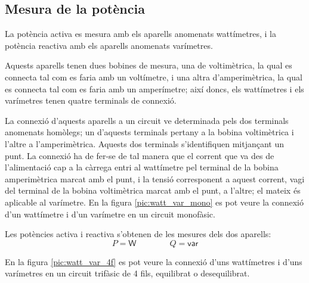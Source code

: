 \subsection{Mesura de la potència}

La potència activa es mesura amb els aparells anomenats wattímetres,
i la potència reactiva amb els aparells anomenats varímetres.

Aquests aparells tenen dues bobines de mesura, una de voltimètrica,
la qual es connecta tal com es faria amb un voltímetre, i una altra
d'amperimètrica, la qual es connecta tal com es faria amb un
amperímetre; així doncs, els wattímetres i els varímetres tenen
quatre terminals de connexió.

La connexió d'aquests aparells a un circuit ve determinada pels dos terminals
anomenats homòlegs; un d'aquests terminals pertany a la bobina
voltimètrica i l'altre a l'amperimètrica. Aquests dos terminals s'identifiquen mitjançant un punt. La connexió
ha de fer-se de tal manera que el corrent que va des de
l'alimentació cap a la càrrega entri al wattímetre pel terminal de
la bobina amperimètrica marcat amb el punt, i la tensió corresponent
a aquest corrent, vagi del terminal de la bobina voltimètrica marcat
amb el punt, a l'altre; el mateix és aplicable al
varímetre. En la figura \vref{pic:watt_var_mono} es pot veure la connexió d'un wattímetre i d'un varímetre en un circuit monofàsic.


\begin{center}
    
    \label{pic:watt_var_mono}
\end{center}

Les potències activa i reactiva s'obtenen de les mesures dels dos
aparells:
\begin{equation}
    P = \textsf{W} \qquad\qquad Q = \textsf{var}
\end{equation}

En la figura \vref{pic:watt_var_4f} es pot veure la connexió d'uns
wattímetres i d'uns varímetres en un circuit trifàsic de 4 fils,
equilibrat o desequilibrat.

\begin{center}
    
    \label{pic:watt_var_4f}
\end{center}

